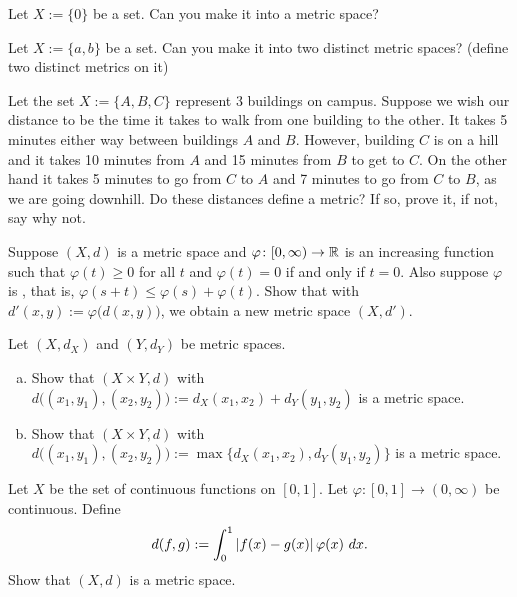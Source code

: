 \begin{exercise}
Let $X := \{ 0 \}$ be a set.  Can you make it into a metric space?
\end{exercise}

\begin{exercise}
Let $X := \{ a, b \}$ be a set.  Can you make it into two distinct metric
spaces?  (define two distinct metrics on it)
\end{exercise}

\begin{exercise}
Let the set $X := \{ A, B, C \}$ represent 3 buildings on campus.  Suppose we
wish our distance to be the time it takes to walk from one building to
the other.
It takes 5 minutes either way between buildings $A$ and $B$.  However,
building $C$ is on a hill and it takes 10 minutes from $A$ and 15 minutes
from $B$ to get to $C$.  On the other hand it takes 5 minutes to go
from $C$ to $A$ and 7 minutes to go from $C$ to $B$, as we are going
downhill.  Do these distances define a metric?  If so, prove it, if not, say
why not.
\end{exercise}

\begin{exercise}
Suppose $(X,d)$ is a metric space and
$\varphi \colon [0,\infty) \to {\mathbb{R}}$ is
an increasing function such that 
$\varphi(t) \geq 0$ for all $t$ and $\varphi(t) = 0$ if and only if
$t=0$.  Also suppose $\varphi$ is \emph{},
that is, $\varphi(s+t) \leq \varphi(s)+\varphi(t)$.
Show that with $d'(x,y) := \varphi\bigl(d(x,y)\bigr)$, we obtain a new
metric space $(X,d')$.
\end{exercise}

\begin{exercise} \label{exercise:mscross}
Let $(X,d_X)$ and $(Y,d_Y)$ be metric spaces.
\begin{enumerate}[a)]
\item
Show that $(X \times Y,d)$ with
$d\bigl( (x_1,y_1), (x_2,y_2) \bigr) := d_X(x_1,x_2) + d_Y(y_1,y_2)$ is
a metric space.
\item
Show that $(X \times Y,d)$ with
$d\bigl( (x_1,y_1), (x_2,y_2) \bigr) := \max \bigl\{ d_X(x_1,x_2) ,
d_Y(y_1,y_2) \bigr\}$ is
a metric space.
\end{enumerate}
\end{exercise}

\begin{exercise}
Let $X$ be the set of continuous functions on $[0,1]$.  Let $\varphi \colon
[0,1] \to (0,\infty)$ be continuous.  Define
\begin{equation*}
d(f,g) := \int_0^1 \left\lvert {f(x)-g(x)} \right\rvert\varphi(x)~dx .
\end{equation*}
Show that $(X,d)$ is a metric space.
\end{exercise}

